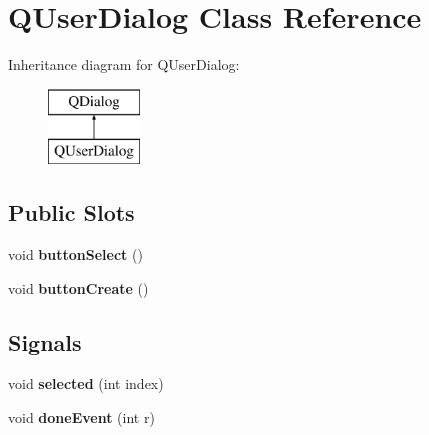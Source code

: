\hypertarget{classQUserDialog}{\section{Q\+User\+Dialog Class Reference}
\label{classQUserDialog}
}
Inheritance diagram for Q\+User\+Dialog\+:\begin{figure}[H]
\begin{center}
\leavevmode
\includegraphics[height=2.000000cm]{classQUserDialog}
\end{center}
\end{figure}
\subsection*{Public Slots}
\begin{DoxyCompactItemize}
\item 
\hypertarget{classQUserDialog_ab8a9714ab638d850404417ed557bc45b}{void {\bfseries button\+Select} ()}\label{classQUserDialog_ab8a9714ab638d850404417ed557bc45b}

\item 
\hypertarget{classQUserDialog_a5028dd340b6debc4e5e4f796b781424e}{void {\bfseries button\+Create} ()}\label{classQUserDialog_a5028dd340b6debc4e5e4f796b781424e}

\end{DoxyCompactItemize}
\subsection*{Signals}
\begin{DoxyCompactItemize}
\item 
\hypertarget{classQUserDialog_a52d586a04c6b84f861ed6a143a606392}{void {\bfseries selected} (int index)}\label{classQUserDialog_a52d586a04c6b84f861ed6a143a606392}

\item 
\hypertarget{classQUserDialog_a12a528506faa30792c940725ac92ba72}{void {\bfseries done\+Event} (int r)}\label{classQUserDialog_a12a528506faa30792c940725ac92ba72}

\end{DoxyCompactItemize}
